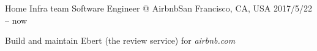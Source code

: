 


\begin{cventries}


\cventry
{Home Infra team}
{Software Engineer @ Airbnb}{San Francisco, CA, USA}
{2017/5/22 -- now}
{
  \begin{cvitems}
  \item Build and maintain Ebert (the review service) for \emph{airbnb.com}
  \end{cvitems}
}

\end{cventries}
